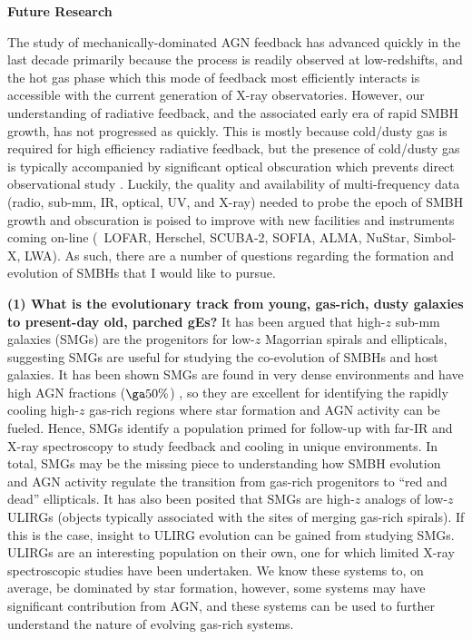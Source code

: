 \documentclass[12pt]{article}
\begin{document}
{\bf{Future Research}}

The study of mechanically-dominated AGN feedback has advanced quickly
in the last decade primarily because the process is readily observed
at low-redshifts, and the hot gas phase which this mode of feedback
most efficiently interacts is accessible with the current generation
of X-ray observatories. However, our understanding of radiative
feedback, and the associated early era of rapid SMBH growth, has not
progressed as quickly. This is mostly because cold/dusty gas is
required for high efficiency radiative feedback, but the presence of
cold/dusty gas is typically accompanied by significant optical
obscuration which prevents direct observational study
\cite{2009arXiv0911.3911A}. Luckily, the quality and availability
of multi-frequency data (radio, sub-mm, IR, optical, UV, and X-ray)
needed to probe the epoch of SMBH growth and obscuration is poised to
improve with new facilities and instruments coming on-line (\ie\
LOFAR, Herschel, SCUBA-2, SOFIA, ALMA, NuStar, Simbol-X, LWA). As such,
there are a number of questions regarding the formation and evolution
of SMBHs that I would like to pursue.


{\bf{(1) What is the evolutionary track from young, gas-rich, dusty
galaxies to present-day old, parched gEs?}} It has been argued that
high-$z$ sub-mm galaxies (SMGs) are the progenitors for low-$z$
Magorrian spirals and ellipticals, suggesting SMGs are useful for
studying the co-evolution of SMBHs and host galaxies. It has been
shown SMGs are found in very dense environments and have high AGN
fractions ($\ga 50\%$) \cite{2005ApJ...632..736A}, so they are
excellent for identifying the rapidly cooling high-$z$ gas-rich
regions where star formation and AGN activity can be fueled. Hence,
SMGs identify a population primed for follow-up with far-IR and X-ray
spectroscopy to study feedback and cooling in unique environments. In
total, SMGs may be the missing piece to understanding how SMBH
evolution and AGN activity regulate the transition from gas-rich
progenitors to ``red and dead'' ellipticals. It has also been posited
that SMGs are high-$z$ analogs of low-$z$ ULIRGs (objects typically
associated with the sites of merging gas-rich spirals). If this is the
case, insight to ULIRG evolution can be gained from studying
SMGs. ULIRGs are an interesting population on their own, one for which
limited X-ray spectroscopic studies have been undertaken. We know
these systems to, on average, be dominated by star formation, however,
some systems may have significant contribution from AGN, and these
systems can be used to further understand the nature of evolving
gas-rich systems.
\end{document}
